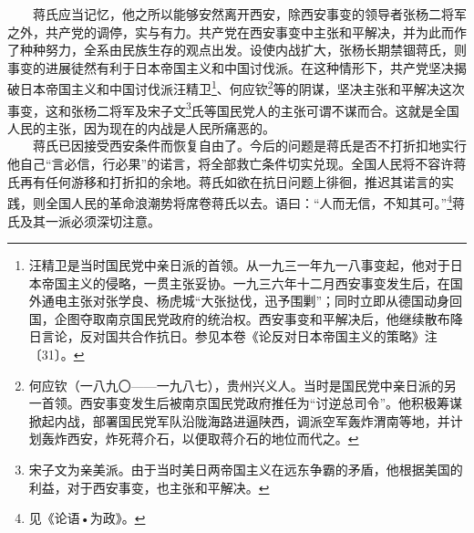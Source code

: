 \documentclass[cn,11pt,chinese]{elegantbook}
\begin{document}
　　蒋氏应当记忆，他之所以能够安然离开西安，除西安事变的领导者张杨二将军之外，共产党的调停，实与有力。共产党在西安事变中主张和平解决，并为此而作了种种努力，全系由民族生存的观点出发。设使内战扩大，张杨长期禁锢蒋氏，则事变的进展徒然有利于日本帝国主义和中国讨伐派。在这种情形下，共产党坚决揭破日本帝国主义和中国讨伐派汪精卫\footnote[5]{ 汪精卫是当时国民党中亲日派的首领。从一九三一年九一八事变起，他对于日本帝国主义的侵略，一贯主张妥协。一九三六年十二月西安事变发生后，在国外通电主张对张学良、杨虎城“大张挞伐，迅予围剿”；同时立即从德国动身回国，企图夺取南京国民党政府的统治权。西安事变和平解决后，他继续散布降日言论，反对国共合作抗日。参见本卷《论反对日本帝国主义的策略》注〔31〕。}、何应钦\footnote[6]{ 何应钦（一八九〇——一九八七），贵州兴义人。当时是国民党中亲日派的另一首领。西安事变发生后被南京国民党政府推任为“讨逆总司令”。他积极筹谋掀起内战，部署国民党军队沿陇海路进逼陕西，调派空军轰炸渭南等地，并计划轰炸西安，炸死蒋介石，以便取蒋介石的地位而代之。}等的阴谋，坚决主张和平解决这次事变，这和张杨二将军及宋子文\footnote[7]{ 宋子文为亲美派。由于当时美日两帝国主义在远东争霸的矛盾，他根据美国的利益，对于西安事变，也主张和平解决。}氏等国民党人的主张可谓不谋而合。这就是全国人民的主张，因为现在的内战是人民所痛恶的。\\
　　蒋氏已因接受西安条件而恢复自由了。今后的问题是蒋氏是否不打折扣地实行他自己“言必信，行必果”的诺言，将全部救亡条件切实兑现。全国人民将不容许蒋氏再有任何游移和打折扣的余地。蒋氏如欲在抗日问题上徘徊，推迟其诺言的实践，则全国人民的革命浪潮势将席卷蒋氏以去。语曰：“人而无信，不知其可。”\footnote[8]{ 见《论语•为政》。}蒋氏及其一派必须深切注意。\\
\end{document}
